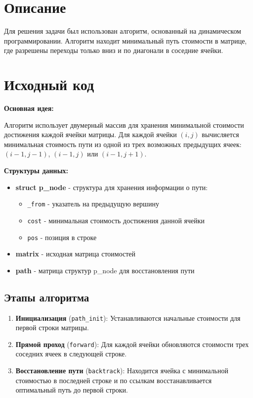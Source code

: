 \section{Описание}
Для решения задачи был использован алгоритм, основанный на динамическом программировании. 
Алгоритм находит минимальный путь стоимости в матрице, где разрешены переходы только 
вниз и по диагонали в соседние ячейки.

\section{Исходный код}
{\bfseries Основная идея:}

Алгоритм использует двумерный массив для хранения минимальной стоимости достижения 
каждой ячейки матрицы. Для каждой ячейки $(i, j)$ вычисляется минимальная стоимость 
пути из одной из трех возможных предыдущих ячеек: $(i-1, j-1)$, $(i-1, j)$ или $(i-1, j+1)$.

{\bfseries Структуры данных:}

\begin{itemize}
    \item \textbf{struct p\_node} - структура для хранения информации о пути:
    \begin{itemize}
        \item \texttt{\_from} - указатель на предыдущую вершину
        \item \texttt{cost} - минимальная стоимость достижения данной ячейки
        \item \texttt{pos} - позиция в строке
    \end{itemize}
    \item \textbf{matrix} - исходная матрица стоимостей
    \item \textbf{path} - матрица структур p\_node для восстановления пути
\end{itemize}

\subsection{Этапы алгоритма}
\begin{enumerate}
    \item \textbf{Инициализация} (\texttt{path\_init}): 
    Устанавливаются начальные стоимости для первой строки матрицы.
    
    \item \textbf{Прямой проход} (\texttt{forward}): 
    Для каждой ячейки обновляются стоимости трех соседних ячеек в следующей строке.
    
    \item \textbf{Восстановление пути} (\texttt{backtrack}): 
    Находится ячейка с минимальной стоимостью в последней строке и по ссылкам восстанавливается 
    оптимальный путь до первой строки.
\end{enumerate}

